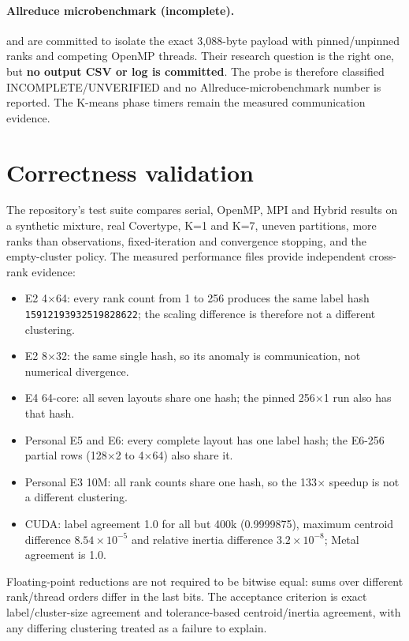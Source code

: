 \documentclass[10pt,a4paper]{article}
\newcommand{\code}[1]{\texttt{#1}}
\begin{document}
\paragraph{Allreduce microbenchmark (incomplete).}
 and 
are committed to isolate the exact 3,088-byte payload with pinned/unpinned
ranks and competing OpenMP threads. Their research question is the right one,
but \textbf{no output CSV or log is committed}. The probe is therefore
classified INCOMPLETE/UNVERIFIED and no Allreduce-microbenchmark number is
reported. The K-means phase timers remain the measured communication evidence.

\section{Correctness validation}
The repository's test suite compares serial, OpenMP, MPI and Hybrid results on
a synthetic mixture, real Covertype, K=1 and K=7, uneven partitions, more ranks
than observations, fixed-iteration and convergence stopping, and the
empty-cluster policy. The measured performance files provide independent
cross-rank evidence:
\begin{itemize}
\item E2 4$\times$64: every rank count from 1 to 256 produces the same label
      hash \code{15912193932519828622}; the scaling difference is therefore not
      a different clustering.
\item E2 8$\times$32: the same single hash, so its anomaly is communication,
      not numerical divergence.
\item E4 64-core: all seven layouts share one hash; the pinned 256$\times$1
      run also has that hash.
\item Personal E5 and E6: every complete layout has one label hash; the E6-256
      partial rows (128$\times$2 to 4$\times$64) also share it.
\item Personal E3 10M: all rank counts share one hash, so the 133$\times$
      speedup is not a different clustering.
\item CUDA: label agreement 1.0 for all but 400k (0.9999875), maximum centroid
      difference $8.54\times10^{-5}$ and relative inertia difference
      $3.2\times10^{-8}$; Metal agreement is 1.0.
\end{itemize}
Floating-point reductions are not required to be bitwise equal: sums over
different rank/thread orders differ in the last bits. The acceptance criterion
is exact label/cluster-size agreement and tolerance-based centroid/inertia
agreement, with any differing clustering treated as a failure to explain.
\end{document}
